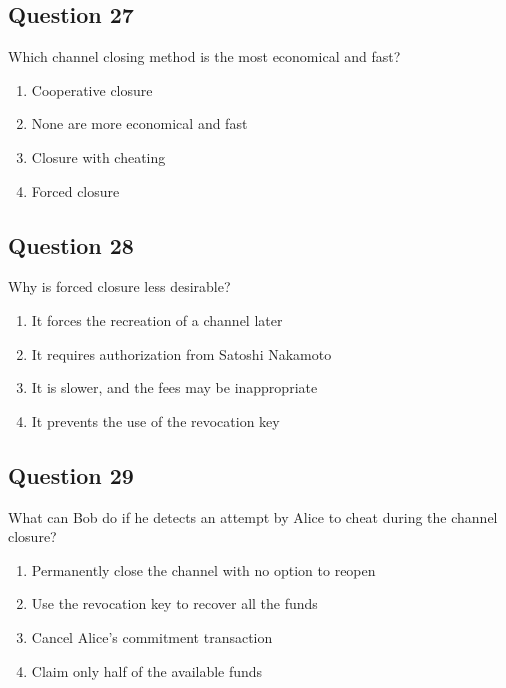 \documentclass[12pt,a4paper]{article}
\begin{document}
\bigskip


\subsection*{Question 27}
Which channel closing method is the most economical and fast?

\begin{enumerate}[label=\Alph*., leftmargin=*]
\item Cooperative closure
\item None are more economical and fast
\item Closure with cheating
\item Forced closure
\end{enumerate}

\bigskip


\subsection*{Question 28}
Why is forced closure less desirable?

\begin{enumerate}[label=\Alph*., leftmargin=*]
\item It forces the recreation of a channel later
\item It requires authorization from Satoshi Nakamoto
\item It is slower, and the fees may be inappropriate
\item It prevents the use of the revocation key
\end{enumerate}

\bigskip


\subsection*{Question 29}
What can Bob do if he detects an attempt by Alice to cheat during the channel closure?

\begin{enumerate}[label=\Alph*., leftmargin=*]
\item Permanently close the channel with no option to reopen
\item Use the revocation key to recover all the funds
\item Cancel Alice's commitment transaction
\item Claim only half of the available funds
\end{enumerate}

\bigskip
\end{document}
